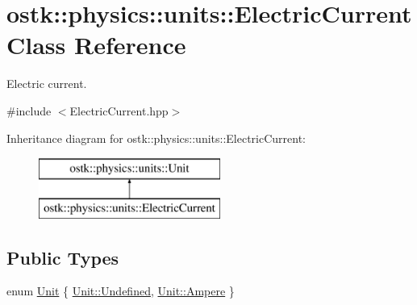 \hypertarget{classostk_1_1physics_1_1units_1_1_electric_current}{}\section{ostk\+:\+:physics\+:\+:units\+:\+:Electric\+Current Class Reference}
\label{classostk_1_1physics_1_1units_1_1_electric_current}


Electric current.  




{\ttfamily \#include $<$Electric\+Current.\+hpp$>$}

Inheritance diagram for ostk\+:\+:physics\+:\+:units\+:\+:Electric\+Current\+:\begin{figure}[H]
\begin{center}
\leavevmode
\includegraphics[height=2.000000cm]{classostk_1_1physics_1_1units_1_1_electric_current}
\end{center}
\end{figure}
\subsection*{Public Types}
\begin{DoxyCompactItemize}
\item 
enum \hyperlink{classostk_1_1physics_1_1units_1_1_electric_current_ac57c87a7533dc73b87185b0d9ae6985b}{Unit} \{ \hyperlink{classostk_1_1physics_1_1units_1_1_electric_current_ac57c87a7533dc73b87185b0d9ae6985baec0fc0100c4fc1ce4eea230c3dc10360}{Unit\+::\+Undefined}, 
\hyperlink{classostk_1_1physics_1_1units_1_1_electric_current_ac57c87a7533dc73b87185b0d9ae6985ba2ee3b9f6a94ce5398d1386f42f9c87ac}{Unit\+::\+Ampere}
 \}
\end{DoxyCompactItemize}
